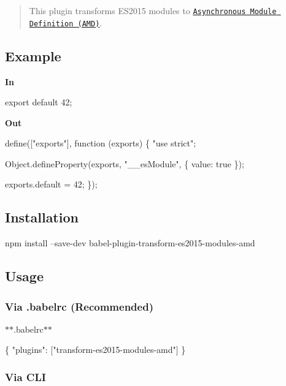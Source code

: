 \begin{quote}
This plugin transforms E\+S2015 modules to \href{https://github.com/amdjs/amdjs-api}{\tt Asynchronous Module Definition (A\+MD)}. \end{quote}


\subsection*{Example}

{\bfseries In}


\begin{DoxyCode}
export default 42;
\end{DoxyCode}


{\bfseries Out}


\begin{DoxyCode}
define(["exports"], function (exports) \{
  "use strict";

  Object.defineProperty(exports, "\_\_esModule", \{
    value: true
  \});

  exports.default = 42;
\});
\end{DoxyCode}


\subsection*{Installation}


\begin{DoxyCode}
npm install --save-dev babel-plugin-transform-es2015-modules-amd
\end{DoxyCode}


\subsection*{Usage}

\subsubsection*{Via {\ttfamily .babelrc} (Recommended)}

$\ast$$\ast$.babelrc$\ast$$\ast$


\begin{DoxyCode}
\{
  "plugins": ["transform-es2015-modules-amd"]
\}
\end{DoxyCode}


\subsubsection*{Via C\+LI}


